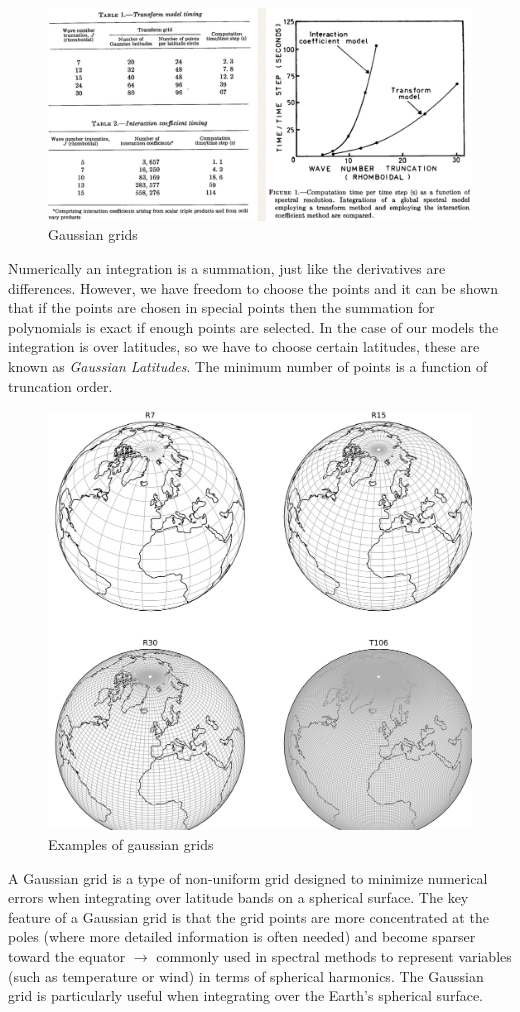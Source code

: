 \begin{figure}[htpb]
    \centering
    \includegraphics[width=0.58\linewidth]{uploads/Screenshot 2024-11-18 100538.png}
    \caption{Gaussian grids}
    \label{fig:gaussian grids}
\end{figure}

Numerically an integration is a summation, just like the derivatives are differences. However, we have freedom to choose the points and it can be shown that if the points are chosen in special points then the summation for polynomials is exact if enough points are selected. In the case of our models the integration is over latitudes, so we have to choose certain latitudes, these are known as \textit{Gaussian Latitudes}. The minimum number of points is a function of truncation order.

\begin{figure}[htpb]
    \centering
    \includegraphics[width=0.5\linewidth]{uploads/gaussian grids.png}
    \caption{Examples of gaussian grids}
    \label{fig:enter-label}
\end{figure}
A Gaussian grid is a type of non-uniform grid designed to minimize numerical errors when integrating over latitude bands on a spherical surface. The key feature of a Gaussian grid is that the grid points are more concentrated at the poles (where more detailed information is often needed) and become sparser toward the equator $\rightarrow$ commonly used in spectral methods to represent variables (such as temperature or wind) in terms of spherical harmonics. The Gaussian grid is particularly useful when integrating over the Earth's spherical surface.
